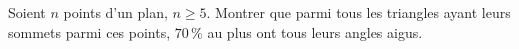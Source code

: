 Soient $n$ points d'un plan, $n \geq 5$. Montrer que parmi tous les triangles ayant leurs sommets parmi ces points, $70\,\%$ au plus ont tous leurs angles aigus.
